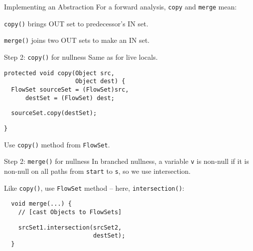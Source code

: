 \begin{slide}{Implementing an Abstraction}
\vspace*{-0.2in}
For a forward analysis, {\tt copy} and {\tt merge} mean:
\begin{center}

\end{center}
{\tt copy()} brings OUT set to predecessor's IN set.

\begin{center}

\end{center}
{\tt merge()} joins two OUT sets to make an IN set.
\end{slide}

\begin{slide}{Step 2: {\tt copy()} for nullness}
Same as for live locals.

\begin{verbatim}
protected void copy(Object src, 
                    Object dest) {
  FlowSet sourceSet = (FlowSet)src,
      destSet = (FlowSet) dest;

\end{verbatim}    
{\red\verb+  sourceSet.copy(destSet);+}
\begin{verbatim}
}
\end{verbatim}

\qquad

Use {\tt copy()} method from {\tt FlowSet}.
\end{slide}

\begin{slide}{Step 2: {\tt merge()} for nullness}
In branched nullness, a variable {\tt v} is non-null if it is non-null
on all paths from {\tt start} to {\tt s}, so we use intersection.

\qquad

Like {\tt copy()}, use {\tt FlowSet} method -- here, {\tt intersection()}:

\vspace*{0.05in}

\begin{verbatim}
  void merge(...) {
    // [cast Objects to FlowSets]
\end{verbatim}
{\red\verb+    srcSet1.intersection(srcSet2,+\\
     \verb+                         destSet);+}\\
\verb+  }+

\end{slide}


